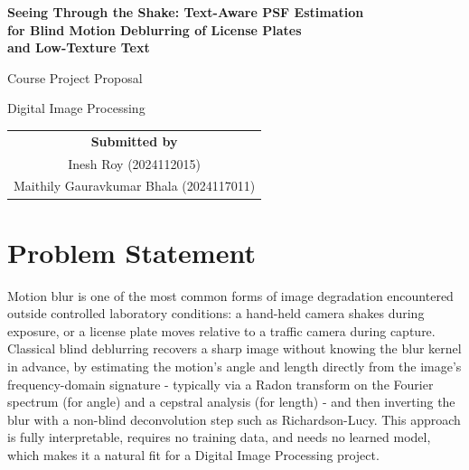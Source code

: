 \documentclass[11pt,a4paper]{article}
\begin{document}
\begin{titlepage}
\centering
\vspace*{2cm}

{\LARGE \bfseries Seeing Through the Shake: Text-Aware PSF Estimation \\[4pt] for Blind Motion Deblurring of License Plates \\[4pt] and Low-Texture Text}

\vspace{1.2cm}
{\large Course Project Proposal}

\vspace{0.4cm}
{\large Digital Image Processing}

\vspace{2cm}
{\large
\begin{tabular}{c}
\textbf{Submitted by} \\[4pt]
Inesh Roy (2024112015) \\
Maithily Gauravkumar Bhala (2024117011) \\
\end{tabular}
}

\vspace{1cm}

\vfill

\end{titlepage}

\section{Problem Statement}

Motion blur is one of the most common forms of image degradation encountered outside
controlled laboratory conditions: a hand-held camera shakes during exposure, or a license
plate moves relative to a traffic camera during capture. Classical blind deblurring recovers
a sharp image without knowing the blur kernel in advance, by estimating the motion's
angle and length directly from the image's frequency-domain signature - typically via a
Radon transform on the Fourier spectrum (for angle) and a cepstral analysis (for length) -
and then inverting the blur with a non-blind deconvolution step such as Richardson-Lucy.
This approach is fully interpretable, requires no training data, and needs no learned model,
which makes it a natural fit for a Digital Image Processing project.
\end{document}
